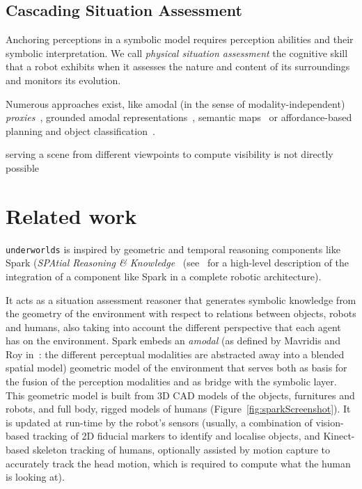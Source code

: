 \documentclass[letterpaper, 10 pt, conference]{ieeeconf}  %
\newcommand{\uwds}{{\tt underworlds}\xspace}
\begin{document}
\subsection{Cascading Situation Assessment}

Anchoring perceptions in a symbolic model requires perception abilities and
their symbolic interpretation. We call \emph{physical situation assessment} the
cognitive skill that a robot exhibits when it assesses the nature and content of its
surroundings and monitors its evolution.

Numerous approaches exist, like amodal (in the sense of modality-independent)
\emph{proxies}~\cite{Jacobsson2008}, grounded amodal
representations~\cite{Mavridis2006}, semantic
maps~\cite{Nuechter2008, Galindo2008,Blodow2011} or affordance-based planning
and object classification~\cite{Lorken2008, Varadarajan2011}.

serving a scene from
different viewpoints to compute visibility is not directly possible


\section{Related work}


\cite{sisbot2011situation}
\cite{naef2003blue}
\cite{bustos2016unified}

\uwds is inspired by geometric and temporal reasoning components like {\sc
Spark} (\emph{SPAtial Reasoning \&
Knowledge}~\cite{sisbot2011situation} (see~\cite{lemaignan2016artificial} for a
high-level description of the integration of a component like {\sc Spark} in a
complete robotic architecture).

It acts as a situation assessment reasoner that generates symbolic knowledge from the
geometry of the environment with respect to relations between objects, robots
and humans, also
taking into account the different perspective that each agent has on the
environment.  {\sc Spark} embeds an \emph{amodal} (as defined by Mavridis and
Roy in~\cite{Mavridis2006}: the different perceptual modalities are abstracted
away into a blended spatial model) geometric model of the environment that
serves both as basis for the fusion of the perception modalities and as bridge
with the symbolic layer. This geometric model is built from 3D CAD models of the
objects, furnitures and robots, and full body, rigged models of humans
(Figure~\ref{fig:sparkScreenshot}).  It is updated at run-time by the robot's
sensors (usually, a combination of vision-based tracking of 2D fiducial markers
to identify and localise objects, and Kinect-based skeleton tracking of humans,
optionally assisted by motion capture to accurately track the head motion, which
is required to compute what the human is looking at).
\end{document}
